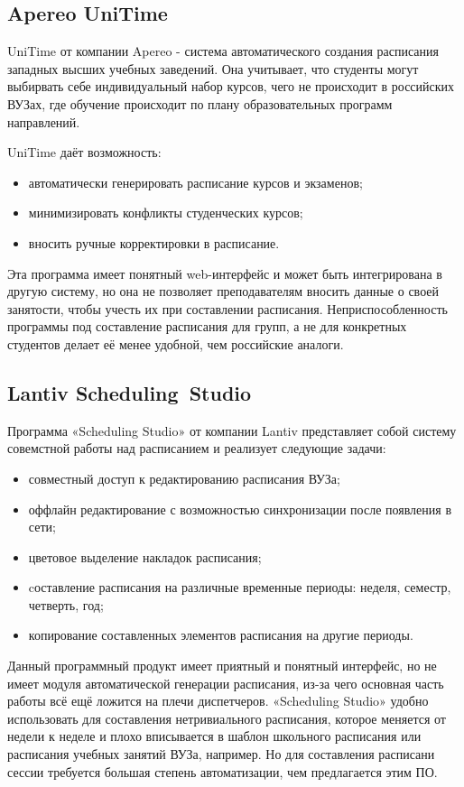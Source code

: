 \subsection {Apereo UniTime}
UniTime от компании Apereo \cite{unitime} - система автоматического создания расписания западных высших учебных заведений. Она учитывает, что студенты могут выбирвать себе индивидуальный набор курсов, чего не происходит в российских ВУЗах, где обучение происходит по плану образовательных программ направлений.

UniTime даёт возможность:
\begin{itemize}
	\item автоматически генерировать расписание курсов и экзаменов;
	\item минимизировать конфликты студенческих курсов;
	\item вносить ручные корректировки в расписание.
\end{itemize}

Эта программа имеет понятный web-интерфейс и может быть интегрирована в другую систему, но она не позволяет преподавателям вносить данные о своей занятости, чтобы учесть их при составлении расписания. Неприспособленность программы под составление расписания для групп, а не для конкретных студентов делает её менее удобной, чем российские аналоги.

\subsection {Lantiv Scheduling Studio} 
Программа «Scheduling Studio» \cite{lantiv} от компании Lantiv представляет собой систему совемстной работы над расписанием и реализует следующие задачи:

\begin{itemize}
	\item совместный доступ к редактированию расписания ВУЗа;
	\item оффлайн редактирование с возможностью синхронизации после появления в сети;
	\item цветовое выделение накладок расписания;
	\item cоставление расписания на различные временные периоды: неделя, семестр, четверть, год;
	\item копирование составленных элементов расписания на другие периоды.
\end{itemize}

Данный программный продукт имеет приятный и понятный интерфейс, но не имеет модуля автоматической генерации расписания, из-за чего основная часть работы всё ещё ложится на плечи диспетчеров. «Scheduling Studio» удобно использовать для составления нетривиального расписания, которое меняется от недели к неделе и плохо вписывается в шаблон школьного расписания или расписания учебных занятий ВУЗа, например. Но для составления расписани сессии требуется большая степень автоматизации, чем предлагается этим ПО.

